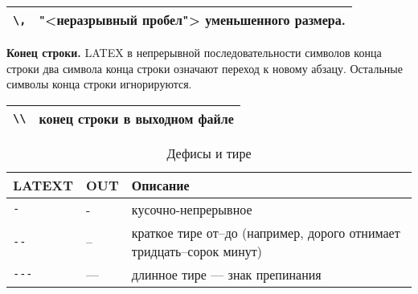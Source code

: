 \begin{table*}[h!]
    \begin{tabular}{|l|p{}|}
        \hline
        \verb|\,| & "<неразрывный пробел"> уменьшенного размера.\\
        \hline
    \end{tabular}
\end{table*}

\textbf{Конец строки.} LATEX в непрерывной последовательности символов конца строки два символа конца строки означают переход к новому абзацу. Остальные символы конца строки игнорируются.

\begin{table*}[h!]
    \begin{tabular}{|l|p{}|}
        \hline
        \verb|\\| & конец строки в выходном файле\\
        \hline
    \end{tabular}
\end{table*}

\begin{table}[h!]
    \caption{Дефисы и тире}
    \begin{tabular}{|l|l|p{}|}
        \hline
        \textbf{LATEXT} &
        \textbf{OUT}    &
        \textbf{Описание} \\ \hline
        \verb|-| & - & кусочно-непрерывное \\ \hline
        \verb|--| & -- & краткое тире от--до (например, дорого отнимает тридцать--сорок минут) \\ \hline
        \verb|---| & --- & длинное тире --- знак препинания \\ \hline
    \end{tabular}
\end{table}

\noindent{}

\clearpage